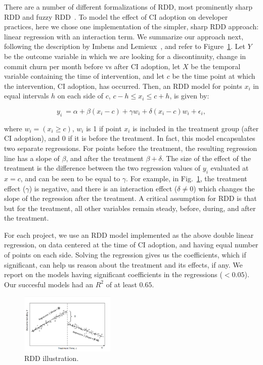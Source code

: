 There are a number of different formalizations of RDD, most prominently 
sharp RDD and fuzzy RDD~\cite{imbens2008regression}.
To model the effect of CI adoption on developer practices, here we chose one implementation
of the simpler, sharp RDD approach: linear regression with an interaction term.
We summarize our approach next, following the description by Imbens and 
Lemieux~\cite{imbens2008regression}, and refer to Figure~\ref{RDDIllustration}.
Let $Y$ be the outcome variable in which we are looking for a discontinuity, 
\eg change in commit churn per month before vs after CI adoption, let $X$ be the temporal variable containing the 
time of intervention, and let $c$ be the time point at which the intervention, \eg CI adoption, has occurred.
Then, an RDD model for points $x_i$ in equal intervals $h$ on each side of 
$c$, $c-h \le x_i \le c+h$, is given by:

\[y_i \ = \alpha + \beta(x_i-c) + \gamma w_i + \delta(x_i-c)w_i + \epsilon_i,\]

\noindent where $w_i = (x_i \geq c)$, \ie $w_i$ is 1 if point $x_i$ is included in 
the treatment group (\eg after CI adoption), and 0 if it is before the treatment.
In fact, this model encapsulates two separate regressions.
For points before the treatment, the resulting regression line has a slope of 
$\beta$, and after the treatment $\beta + \delta$.
The size of the effect of the treatment is the difference between the two 
regression values of $y_i$ evaluated at $x=c$, and can be seen to be equal 
to $\gamma$.
For example, in Fig.~\ref{RDDIllustration}, the treatment effect ($\gamma$) is negative, and there is an interaction effect ($\delta \neq 0$) which changes the slope of the regression after the treatment.
A critical assumption for RDD is that but for the treatment, all other variables remain steady, before, during, and after the treatment.

For each project, we use an RDD model implemented as the above 
double linear regression, on data centered at the time of CI adoption, and 
having equal number of points on each side.
Solving the regression gives us the coefficients, which if significant, can help us reason about the treatment and its effects, if any.
We report on the models having significant coefficients in the regressions ($<0.05$). Our succesful models had an $R^2$ of at least $0.65$. 



\begin{figure}[t]
	\centering
	\includegraphics[width=0.4\textwidth, clip=true, trim=0 15 15 50]{RDD_plot.png}
	\caption{RDD illustration.}\vspace{-0.5cm}
	\label{RDDIllustration}
\end{figure}

